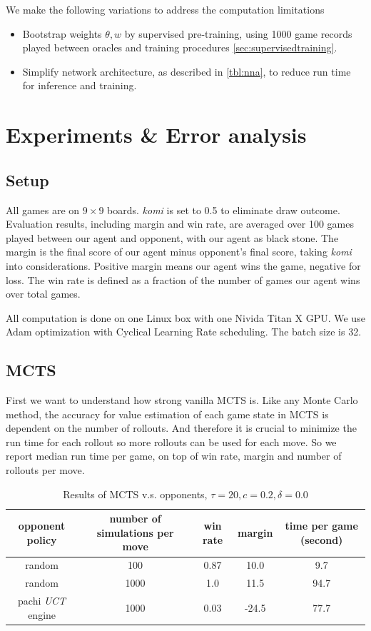 \documentclass{article}
\begin{document}
We make the following variations to address the computation limitations
\begin{itemize}
  \item
    Bootstrap weights $\theta, w$ by supervised pre-training, using 1000 game records played between oracles and training procedures \ref{sec:supervisedtraining}.
  \item
    Simplify network architecture, as described in \ref{tbl:nna}, to reduce run time for inference and training.
\end{itemize}

\section{Experiments \& Error analysis}
\subsection{Setup}
All games are on $9 \times 9$ boards. \textit{komi} is set to 0.5 to eliminate draw outcome. Evaluation results, including margin and win rate, are averaged over 100 games played between our agent and opponent, with our agent as black stone.  The margin is the final score of our agent minus opponent's final score, taking \textit{komi} into considerations. Positive margin means our agent wins the game, negative for loss.  The win rate is defined as a fraction of the number of games our agent wins over total games. 

All computation is done on one Linux box with one Nivida Titan X GPU.  We use Adam \cite{kingma2014adam} optimization with Cyclical Learning Rate scheduling\cite{smith2017cyclical}.  The batch size is 32.  


\subsection{MCTS}

First we want to understand how strong vanilla MCTS is. Like any Monte Carlo method, the accuracy for value estimation of each game state in MCTS is dependent on the number of rollouts. And therefore it is crucial to minimize the run time for each rollout so more rollouts can be used for each move. So we report median run time per game, on top of win rate, margin and number of rollouts per move. 

\begin{table}[ht]
  \caption{Results of MCTS v.s. opponents, $\tau=20, c=0.2, \delta=0.0$}
  \label{tbl:mcts}
  \centering
  \begin{tabular}{c | c | c | c | c}
    opponent policy  &  number of simulations per move & win rate & margin & time per game (second) \\
    \hline
    random            &  100 &  0.87  & 10.0 & 9.7 \\
    random            &  1000 &  1.0  & 11.5 & 94.7 \\
    pachi \textit{UCT} engine  &  1000 & 0.03 & -24.5  & 77.7 \\
  \end{tabular}
\end{table}
\end{document}
